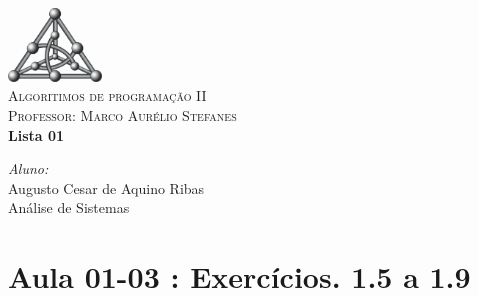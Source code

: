 \documentclass[a4paper,10pt]{article}
\begin{document}
\lstset{language=c,numbers=left,numberstyle=\tiny,breaklines=true,frame=single}

\begin{titlepage}

\begin{center}
\includegraphics[width=2.5cm]{facom_t}\\[0.5cm]
\textsc{\LARGE Algoritimos de programação II}\\[0.5cm]
\textsc{Professor: Marco Aurélio Stefanes}\\[2.5cm]
{ \huge \bfseries Lista 01 \\[0.4cm] }
\end{center}
\vspace{10cm}


\begin{minipage}{1.6\textwidth}
\begin{center}
\emph{Aluno:} \\
Augusto Cesar de Aquino Ribas\\
Análise de Sistemas\\
\end{center}
\end{minipage}%

\end{titlepage}

\newpage
\section{Aula 01-03 : Exercícios. 1.5 a 1.9}
\end{document}
